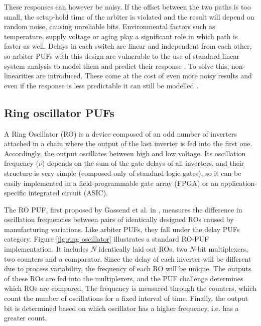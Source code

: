 These responses can however be noisy. If the offset between the two paths is too small, the setup-hold time of the arbiter is violated and the result will depend on random noise, causing unreliable bits. Environmental factors such as temperature, supply voltage or aging play a significant role in which path is faster as well.
Delays in each switch are linear and independent from each other, so arbiter PUFs with this design are vulnerable to the use of standard linear system analysis to model them and predict their response \cite{Arbitermaster}. To solve this, non-linearities are introduced. These come at the cost of even more noisy results and even if the response is less predictable it can still be modelled \cite{Maes2010}.

\subsection{Ring oscillator PUFs}

 A Ring Oscillator (RO) is a device composed of an odd number of inverters attached in a chain where the output of the last inverter is fed into the first one. Accordingly, the output oscillates between high and low voltage. Its oscillation frequency ($\nu$) depends on the sum of the gate delays of all inverters, and their structure is very simple (composed only of standard logic gates), so it can be easily implemented in a field-programmable gate array (FPGA) or an application-specific integrated circuit (ASIC). 

The RO PUF, first proposed by Gassend et al. in \cite{oscillatorog}, measures the difference in oscillation frequencies between pairs of identically designed ROs caused by manufacturing variations. Like arbiter PUFs, they fall under the delay PUFs category. Figure \ref{fig:ring oscillator} illustrates a standard RO-PUF implementation. It includes $N$ identically laid out ROs, two $N$-bit multiplexers, two counters and a comparator. Since the delay of each inverter will be different due to process variability, the frequency of each RO will be unique. The outputs of these ROs are fed into the multiplexers, and the PUF challenge determines which ROs are compared. The frequency is measured through the counters, which count the number of oscillations for a fixed interval of time. Finally, the output bit is determined based on which oscillator has a higher frequency, i.e. has a greater count.

